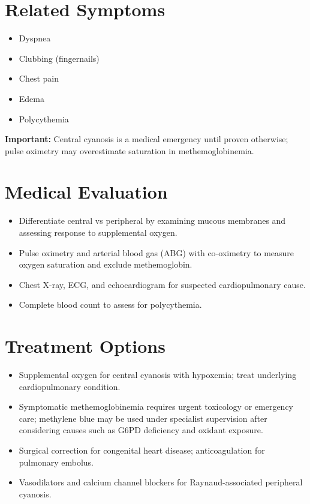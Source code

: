 \section*{Related Symptoms}
\begin{itemize}
  \item Dyspnea
  \item Clubbing (fingernails)
  \item Chest pain
  \item Edema
  \item Polycythemia
\end{itemize}
\textbf{Important:} Central cyanosis is a medical emergency until proven otherwise; pulse oximetry may overestimate saturation in methemoglobinemia.

\section*{Medical Evaluation}
\begin{itemize}
  \item Differentiate central vs peripheral by examining mucous membranes and assessing response to supplemental oxygen.
  \item Pulse oximetry and arterial blood gas (ABG) with co-oximetry to measure oxygen saturation and exclude methemoglobin.
  \item Chest X-ray, ECG, and echocardiogram for suspected cardiopulmonary cause.
  \item Complete blood count to assess for polycythemia.
\end{itemize}

\section*{Treatment Options}
\begin{itemize}
  \item Supplemental oxygen for central cyanosis with hypoxemia; treat underlying cardiopulmonary condition.
  \item Symptomatic methemoglobinemia requires urgent toxicology or emergency care; methylene blue may be used under specialist supervision after considering causes such as G6PD deficiency and oxidant exposure.
  \item Surgical correction for congenital heart disease; anticoagulation for pulmonary embolus.
  \item Vasodilators and calcium channel blockers for Raynaud-associated peripheral cyanosis.
\end{itemize}

